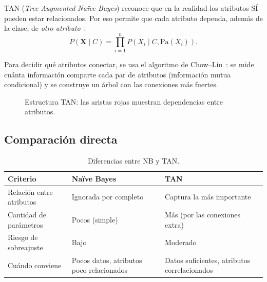 TAN (\emph{Tree Augmented Naïve Bayes}) reconoce que en la realidad los atributos SÍ pueden estar relacionados. Por eso permite que cada atributo dependa, además de la clase, de \emph{otro atributo}~\cite{friedman1997bayesian}:
\begin{equation}
    P(\mathbf{X} \mid C) = \prod_{i=1}^{n} P(X_i \mid C, \mathrm{Pa}(X_i)).
    \label{eq:tan}
\end{equation}

Para decidir qué atributos conectar, se usa el algoritmo de Chow--Liu~\cite{chowliu1968}: se mide cuánta información comparte cada par de atributos (información mutua condicional) y se construye un árbol con las conexiones más fuertes.

\begin{figure}[H]
    \centering
    \caption{Estructura TAN: las aristas rojas muestran dependencias entre atributos.}
    \label{fig:tan-structure}
\end{figure}

\subsection{Comparación directa}

\begin{table}[H]
    \centering\small
    \caption{Diferencias entre NB y TAN.}
    \label{tab:nb-vs-tan}
    \begin{tabular}{p{2.8cm} p{4.2cm} p{4.8cm}}
        \toprule
        \textbf{Criterio} & \textbf{Naïve Bayes} & \textbf{TAN} \\
        \midrule
        Relación entre atributos & Ignorada por completo & Captura la más importante \\[3pt]
        Cantidad de parámetros & Pocos (simple) & Más (por las conexiones extra) \\[3pt]
        Riesgo de sobreajuste & Bajo & Moderado \\[3pt]
        Cuándo conviene & Pocos datos, atributos poco relacionados & Datos suficientes, atributos correlacionados \\
        \bottomrule
    \end{tabular}
\end{table}

